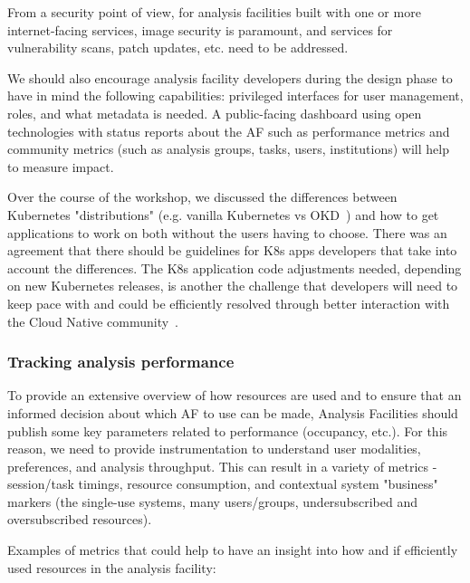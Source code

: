 \documentclass[a4paper,11pt]{article}
\begin{document}
From a security point of view, for analysis facilities built with one or
more internet-facing services, image security is paramount, and services
for vulnerability scans, patch updates, etc. need to be addressed.

We should also encourage analysis facility developers during the design
phase to have in mind the following capabilities: privileged interfaces
for user management, roles, and what metadata is needed. A public-facing
dashboard using open technologies with status reports about the AF such
as performance metrics and community metrics (such as analysis groups,
tasks, users, institutions) will help to measure impact.

Over the course of the workshop, we discussed the differences between
Kubernetes "distributions" (e.g. vanilla Kubernetes vs OKD~\cite{okd}) and how to
get applications to work on both without the users having to choose.
There was an agreement that there should be guidelines for K8s apps
developers that take into account the differences. The K8s application code
adjustments needed, depending on new Kubernetes releases, is another
the challenge that developers will need to keep pace with and could be
efficiently resolved through better interaction with the Cloud Native
community~\cite{cncf}.

\hypertarget{tracking-analysis-performance}{%
\subsubsection{\texorpdfstring{Tracking analysis performance
}{Tracking analysis performance }}\label{tracking-analysis-performance}}

To provide an extensive overview of how resources are used and to ensure
that an informed decision about which AF to use can be made, Analysis
Facilities should publish some key parameters related to performance
(occupancy, etc.). For this reason, we need to provide instrumentation to
understand user modalities, preferences, and analysis throughput. This
can result in a variety of metrics - session/task timings, resource
consumption, and contextual system "business" markers (the single-use
systems, many users/groups, undersubscribed and oversubscribed
resources).

Examples of metrics that could help to have an insight into how and if
efficiently used resources in the analysis facility:
\end{document}
